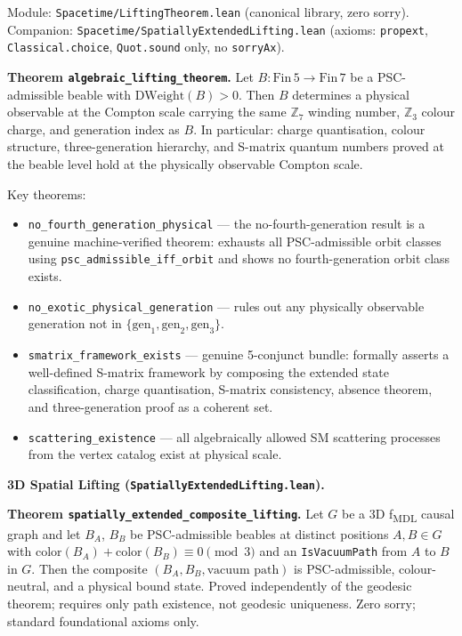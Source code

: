 \documentclass[11pt,a4paper]{article}
\newenvironment{keybox}[1]{%
  \Needspace*{8\baselineskip}%
  \begin{tcolorbox}[
    enhanced,
    breakable=false,
    colback=blue!5,
    colframe=blue!45!black,
    coltitle=black,
    colbacktitle=blue!14,
    boxrule=0.85pt,
    arc=2.5pt,
    left=9pt, right=9pt, top=6pt, bottom=6pt,
    titlerule=0.55pt,
    fonttitle=\bfseries,
    title={#1},
    before upper=\raggedright,
    before skip=0.9\baselineskip,
    after skip=0.9\baselineskip
  ]%
}{%
  \end{tcolorbox}%
}
\theoremstyle{definition}
\begin{document}
Module: \texttt{Spacetime/LiftingTheorem.lean} (canonical library, zero sorry).
Companion: \texttt{Spacetime/SpatiallyExtendedLifting.lean}
(axioms: \texttt{propext},
\texttt{Classical.choice}, \texttt{Quot.sound} only, no \texttt{sorryAx}).

\begin{keybox}{The Algebraic Lifting Theorem}
\textbf{Theorem \lstinline|algebraic_lifting_theorem|.}
Let $B : \mathrm{Fin}\,5 \to \mathrm{Fin}\,7$ be a PSC-admissible beable
with $\mathrm{DWeight}(B) > 0$.
Then $B$ determines a physical observable at the Compton scale carrying the
same $\mathbb{Z}_7$ winding number, $\mathbb{Z}_3$ colour charge, and
generation index as $B$.
In particular: charge quantisation, colour structure, three-generation
hierarchy, and S-matrix quantum numbers proved at the beable level hold at
the physically observable Compton scale.
\end{keybox}

Key theorems:
\begin{itemize}[nosep]
\item \lstinline|no_fourth_generation_physical| — the no-fourth-generation result
  is a genuine machine-verified theorem: exhausts all PSC-admissible orbit
  classes using \lstinline|psc_admissible_iff_orbit| and shows no fourth-generation
  orbit class exists.
\item \lstinline|no_exotic_physical_generation| — rules out any physically
  observable generation not in $\{\mathrm{gen}_1, \mathrm{gen}_2, \mathrm{gen}_3\}$.
\item \lstinline|smatrix_framework_exists| — genuine 5-conjunct bundle:
  formally asserts a well-defined S-matrix framework by composing the
  extended state classification, charge quantisation, S-matrix consistency,
  absence theorem, and three-generation proof as a coherent set.
\item \lstinline|scattering_existence| — all algebraically allowed SM scattering
  processes from the vertex catalog exist at physical scale.
\end{itemize}

\par\medskip\noindent\textbf{3D Spatial Lifting
  (\texttt{SpatiallyExtended\allowbreak Lifting.lean}).}\par\smallskip

\begin{keybox}{Meson existence in 3D}
\textbf{Theorem \texttt{spatially\_extended\_\allowbreak composite\_lifting}.}
Let $G$ be a 3D f\textsubscript{MDL} causal graph and let $B_A$, $B_B$ be
PSC-admissible beables at distinct positions $A, B \in G$ with
$\mathrm{color}(B_A) + \mathrm{color}(B_B) \equiv 0 \pmod{3}$ and an
\lstinline|IsVacuumPath| from $A$ to $B$ in $G$.
Then the composite $(B_A, B_B, \text{vacuum path})$ is PSC-admissible,
colour-neutral, and a physical bound state.
Proved independently of the geodesic theorem; requires only path
existence, not geodesic uniqueness.
Zero sorry; standard foundational axioms only.
\end{keybox}
\end{document}
